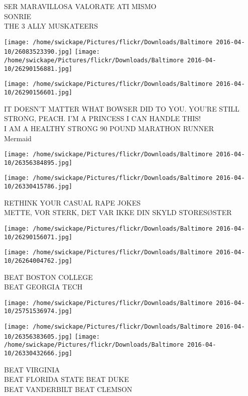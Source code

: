 \documentclass[10pt,letterpaper]{article}
\begin{document}
SER MARAVILLOSA VALORATE ATI MISMO\\
SONRIE\\
THE 3 ALLY MUSKATEERS
\pagebreak

\texttt{[image: /home/swickape/Pictures/flickr/Downloads/Baltimore 2016-04-10/26083523390.jpg]}
\texttt{[image: /home/swickape/Pictures/flickr/Downloads/Baltimore 2016-04-10/26290156881.jpg]}

\texttt{[image: /home/swickape/Pictures/flickr/Downloads/Baltimore 2016-04-10/26290156601.jpg]}

IT DOESN'T MATTER WHAT BOWSER DID TO YOU.  YOU'RE STILL STRONG, PEACH.  I'M A PRINCESS I CAN HANDLE THIS!\\
I AM A HEALTHY STRONG 90 POUND MARATHON RUNNER\\
Mermaid
\pagebreak

\texttt{[image: /home/swickape/Pictures/flickr/Downloads/Baltimore 2016-04-10/26356384895.jpg]}

\vspace{0.25in}
\texttt{[image: /home/swickape/Pictures/flickr/Downloads/Baltimore 2016-04-10/26330415786.jpg]}

RETHINK YOUR CASUAL RAPE JOKES\\
METTE, VOR STERK, DET VAR IKKE DIN SKYLD STORESØSTER
\pagebreak

\texttt{[image: /home/swickape/Pictures/flickr/Downloads/Baltimore 2016-04-10/26290156071.jpg]}

\vspace{0.25in}
\texttt{[image: /home/swickape/Pictures/flickr/Downloads/Baltimore 2016-04-10/26264004762.jpg]}

BEAT BOSTON COLLEGE\\
BEAT GEORGIA TECH
\pagebreak

\texttt{[image: /home/swickape/Pictures/flickr/Downloads/Baltimore 2016-04-10/25751536974.jpg]}

\vspace{0.25in}
\texttt{[image: /home/swickape/Pictures/flickr/Downloads/Baltimore 2016-04-10/26356383605.jpg]}
\texttt{[image: /home/swickape/Pictures/flickr/Downloads/Baltimore 2016-04-10/26330432666.jpg]}

BEAT VIRGINIA\\
BEAT FLORIDA STATE BEAT DUKE\\
BEAT VANDERBILT BEAT CLEMSON
\pagebreak
\end{document}

